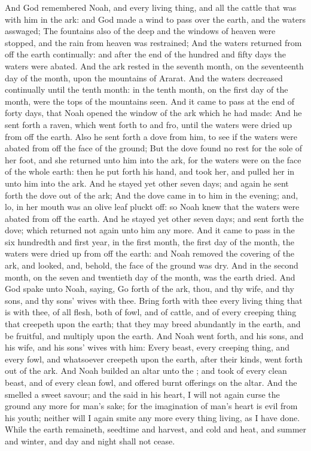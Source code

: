 \begin{biblechapter} %
\verse And God remembered Noah, and every living thing, and all the cattle that was with him in the ark: and God made a wind to pass over the earth, and the waters asswaged;
\verse The fountains also of the deep and the windows of heaven were stopped, and the rain from heaven was restrained;
\verse And the waters returned from off the earth continually: and after the end of the hundred and fifty days the waters were abated.
\verse And the ark rested in the seventh month, on the seventeenth day of the month, upon the mountains of Ararat.
\verse And the waters decreased continually until the tenth month: in the tenth month, on the first day of the month, were the tops of the mountains seen.
\verse And it came to pass at the end of forty days, that Noah opened the window of the ark which he had made:
\verse And he sent forth a raven, which went forth to and fro, until the waters were dried up from off the earth.
\verse Also he sent forth a dove from him, to see if the waters were abated from off the face of the ground;
\verse But the dove found no rest for the sole of her foot, and she returned unto him into the ark, for the waters were on the face of the whole earth: then he put forth his hand, and took her, and pulled her in unto him into the ark.
\verse And he stayed yet other seven days; and again he sent forth the dove out of the ark;
\verse And the dove came in to him in the evening; and, lo, in her mouth was an olive leaf pluckt off: so Noah knew that the waters were abated from off the earth.
\verse And he stayed yet other seven days; and sent forth the dove; which returned not again unto him any more.
\verse And it came to pass in the six hundredth and first year, in the first month, the first day of the month, the waters were dried up from off the earth: and Noah removed the covering of the ark, and looked, and, behold, the face of the ground was dry.
\verse And in the second month, on the seven and twentieth day of the month, was the earth dried.
\verse And God spake unto Noah, saying,
\verse Go forth of the ark, thou, and thy wife, and thy sons, and thy sons' wives with thee.
\verse Bring forth with thee every living thing that is with thee, of all flesh, both of fowl, and of cattle, and of every creeping thing that creepeth upon the earth; that they may breed abundantly in the earth, and be fruitful, and multiply upon the earth.
\verse And Noah went forth, and his sons, and his wife, and his sons' wives with him:
\verse Every beast, every creeping thing, and every fowl, and whatsoever creepeth upon the earth, after their kinds, went forth out of the ark.
\verse And Noah builded an altar unto the \LORD; and took of every clean beast, and of every clean fowl, and offered burnt offerings on the altar.
\verse And the \LORD smelled a sweet savour; and the \LORD said in his heart, I will not again curse the ground any more for man's sake; for the imagination of man's heart is evil from his youth; neither will I again smite any more every thing living, as I have done.
\verse While the earth remaineth, seedtime and harvest, and cold and heat, and summer and winter, and day and night shall not cease.
\end{biblechapter}

